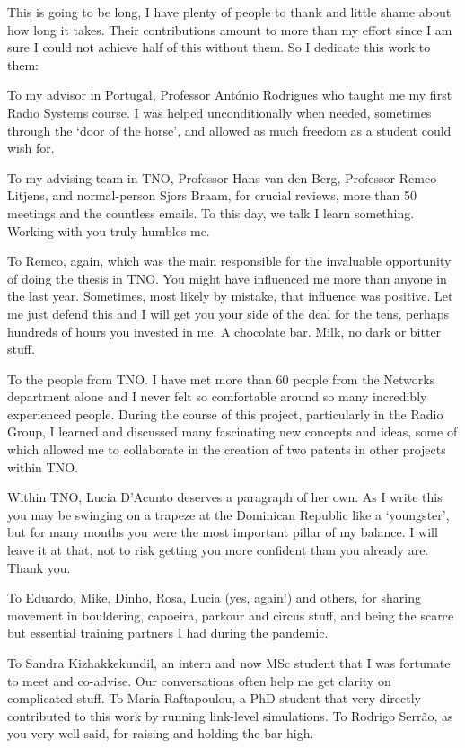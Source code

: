 \begin{acknowledgments} 

This is going to be long, I have plenty of people to thank and little shame about how long it takes. Their contributions amount to more than my effort since I am sure I could not achieve half of this without them. So I dedicate this work to them:

To my advisor in Portugal, Professor António Rodrigues who taught me my first Radio Systems course. I was helped unconditionally when needed, sometimes through the `door of the horse', and allowed as much freedom as a student could wish for.

To my advising team in TNO, Professor Hans van den Berg, Professor Remco Litjens, and normal-person Sjors Braam, for crucial reviews, more than 50 meetings and the countless emails. To this day,  we talk I learn something. Working with you truly humbles me. 

To Remco, again, which was the main responsible for the invaluable opportunity of doing the thesis in TNO. You might have influenced me more than anyone in the last year. Sometimes, most likely by mistake, that influence was positive. Let me just defend this and I will get you your side of the deal for the tens, perhaps hundreds of hours you invested in me. A chocolate bar. Milk, no dark or bitter stuff.

To the people from TNO. I have met more than 60 people from the Networks department alone and I never felt so comfortable around so many incredibly experienced people. During the course of this project, particularly in the Radio Group, I learned and discussed many fascinating new concepts and ideas, some of which allowed me to collaborate in the creation of two patents in other projects within TNO. 

Within TNO, Lucia D'Acunto deserves a paragraph of her own. As I write this you may be swinging on a trapeze at the Dominican Republic like a `youngster', but for many months you were the most important pillar of my balance. I will leave it at that, not to risk getting you more confident than you already are. Thank you.

To Eduardo, Mike, Dinho, Rosa, Lucia (yes, again!) and others, for sharing movement in bouldering, capoeira, parkour and circus stuff, and being the scarce but essential training partners I had during the pandemic.

To Sandra Kizhakkekundil, an intern and now MSc student that I was fortunate to meet and co-advise. Our conversations often help me get clarity on complicated stuff. To Maria Raftapoulou, a PhD student that very directly contributed to this work by running link-level simulations. To Rodrigo Serrão, as you very well said, for raising and holding the bar high.


\end{acknowledgments}
